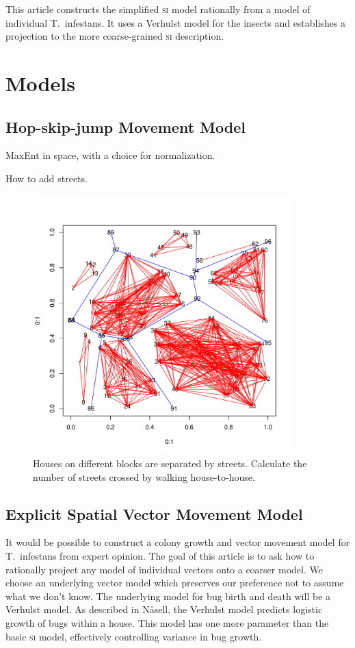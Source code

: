\documentclass{article}
\begin{document}
This article constructs the simplified \textsc{si} model
rationally from a model of individual T.\ infestans. It uses
a Verhulst model for the insects and establishes a projection
to the more coarse-grained \textsc{si} description.


\section{Models}
\subsection{Hop-skip-jump Movement Model}
MaxEnt in space, with a choice for normalization.

How to add streets.

\begin{figure}
\centerline{\includegraphics[width=10cm]{blocks.pdf}}
\caption{Houses on different blocks are separated by streets.
Calculate the number of streets crossed by walking house-to-house.\label{fig:blocks}}
\end{figure}

\subsection{Explicit Spatial Vector Movement Model}
It would be possible to construct a colony growth and
vector movement model for T.\ infestans from expert opinion.
The goal of this article is to ask how to rationally project
any model of individual vectors onto a coarser model.
We choose an underlying vector model which preserves
our preference not to assume what we don't know.
The underlying model for bug birth and death will be
a Verhulst model. As described in N{\aa}sell\cite{Nasell2001},
the Verhulst model predicts logistic growth of bugs within
a house. This model has one more parameter than the
basic \textsc{si} model, effectively controlling variance in
bug growth.
\end{document}
